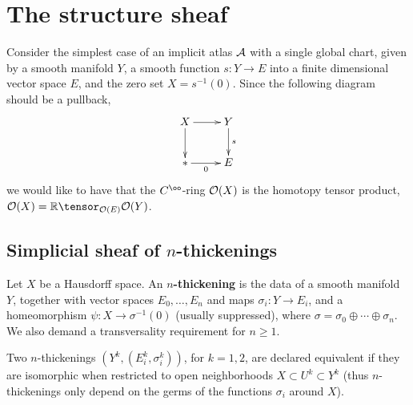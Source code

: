
\section{The structure sheaf}

Consider the simplest case of an implicit atlas $\mathcal A$ with a single global chart, given by a smooth manifold $Y$, a smooth function $s: Y \to E$ into a finite dimensional vector space $E$, and the zero set $X = s^{-1}(0)$. Since the following diagram should be a pullback,
\[ \xymatrix{X \ar[r] \ar[d] & Y \ar[d]^-{s} \\ {*} \ar[r]_-{0} & E}\]
we would like to have that the $C^\oo$-ring $\mathcal O(X)$ is the homotopy tensor product, $\cO(X) = \RR \tensor_{\cO(E)} \cO(Y)$.


\subsection{Simplicial sheaf of $n$-thickenings}

\begin{defn}\label{n-thickening}
Let $X$ be a Hausdorff space. An {\bf $n$-thickening} is the data of a smooth manifold $Y$, together with vector spaces $E_0, \dots, E_n$  and maps $\sigma_i: Y \to E_i$, and a homeomorphism $\psi: X \to \sigma^{-1}(0)$ (usually suppressed), where $\sigma = \sigma_0 \oplus \cdots \oplus \sigma_n$. We also demand a transversality requirement for $n \geq 1$. 

Two $n$-thickenings $(Y^k, (E_i^k, \sigma_i^k))$, for $k = 1, 2$, are declared equivalent if they are isomorphic when restricted to open neighborhoods $X \subset U^k \subset Y^k$ (thus $n$-thickenings only depend on the germs of the functions $\sigma_i$ around $X$).
\end{defn}

